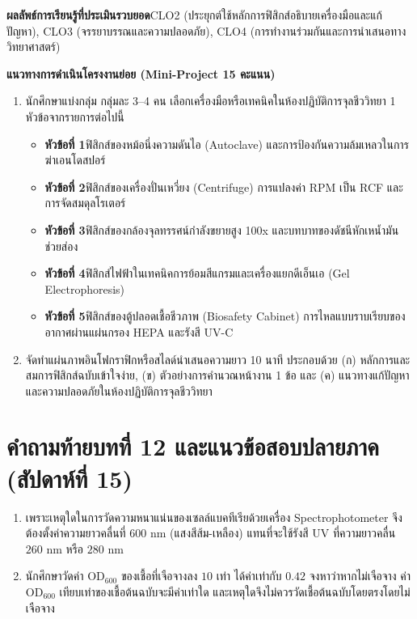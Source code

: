 \vspace{0.3cm}

\begin{labbox}
\noindent\textbf{ผลลัพธ์การเรียนรู้ที่ประเมินรวบยอด}\quad CLO2 (ประยุกต์ใช้หลักการฟิสิกส์อธิบายเครื่องมือและแก้ปัญหา), CLO3 (จรรยาบรรณและความปลอดภัย), CLO4 (การทำงานร่วมกันและการนำเสนอทางวิทยาศาสตร์)

\vspace{4pt}
\noindent\textbf{แนวทางการดำเนินโครงงานย่อย (Mini-Project 15 คะแนน)}
\begin{enumerate}
    \item นักศึกษาแบ่งกลุ่ม กลุ่มละ 3--4 คน เลือกเครื่องมือหรือเทคนิคในห้องปฏิบัติการจุลชีววิทยา 1 หัวข้อจากรายการต่อไปนี้
    \begin{itemize}
        \item \textbf{หัวข้อที่ 1}\quad ฟิสิกส์ของหม้อนึ่งความดันไอ (Autoclave) และการป้องกันความล้มเหลวในการฆ่าเอนโดสปอร์
        \item \textbf{หัวข้อที่ 2}\quad ฟิสิกส์ของเครื่องปั่นเหวี่ยง (Centrifuge) การแปลงค่า RPM เป็น RCF และการจัดสมดุลโรเตอร์
        \item \textbf{หัวข้อที่ 3}\quad ฟิสิกส์ของกล้องจุลทรรศน์กำลังขยายสูง 100x และบทบาทของดัชนีหักเหน้ำมันช่วยส่อง
        \item \textbf{หัวข้อที่ 4}\quad ฟิสิกส์ไฟฟ้าในเทคนิคการย้อมสีแกรมและเครื่องแยกดีเอ็นเอ (Gel Electrophoresis)
        \item \textbf{หัวข้อที่ 5}\quad ฟิสิกส์ของตู้ปลอดเชื้อชีวภาพ (Biosafety Cabinet) การไหลแบบราบเรียบของอากาศผ่านแผ่นกรอง HEPA และรังสี UV-C
    \end{itemize}
    \item จัดทำแผ่นภาพอินโฟกราฟิกหรือสไลด์นำเสนอความยาว 10 นาที ประกอบด้วย (ก) หลักการและสมการฟิสิกส์ฉบับเข้าใจง่าย, (ข) ตัวอย่างการคำนวณหน้างาน 1 ข้อ และ (ค) แนวทางแก้ปัญหาและความปลอดภัยในห้องปฏิบัติการจุลชีววิทยา
\end{enumerate}
\end{labbox}

\section*{คำถามท้ายบทที่ 12 และแนวข้อสอบปลายภาค (สัปดาห์ที่ 15)}
\begin{enumerate}
    \item เพราะเหตุใดในการวัดความหนาแน่นของเซลล์แบคทีเรียด้วยเครื่อง Spectrophotometer จึงต้องตั้งค่าความยาวคลื่นที่ $600\text{ nm}$ (แสงสีส้ม-เหลือง) แทนที่จะใช้รังสี UV ที่ความยาวคลื่น $260\text{ nm}$ หรือ $280\text{ nm}$
    \item นักศึกษาวัดค่า $\text{OD}_{600}$ ของเชื้อที่เจือจางลง $10$ เท่า ได้ค่าเท่ากับ $0.42$ จงหาว่าหากไม่เจือจาง ค่า $\text{OD}_{600}$ เทียบเท่าของเชื้อต้นฉบับจะมีค่าเท่าใด และเหตุใดจึงไม่ควรวัดเชื้อต้นฉบับโดยตรงโดยไม่เจือจาง
\end{enumerate}
